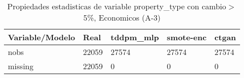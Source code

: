 \begin{table}[H]
\centering
\fontsize{8}{14}\selectfont
\caption{Propiedades estadisticas de variable property\_type con cambio\ensuremath{>}5\%, Economicos (A-3)}
\label{table-stats-economicos-a-3-property_type-short}
\begin{tabular}{|l|m{10em}|m{10em}|m{10em}|m{10em}|}
\hline
 \rowcolor[gray]{0.8}
Variable/Modelo & Real & tddpm\_mlp & smote-enc & ctgan \\
\hline nobs & 22059 & 27574 & 27574 & 27574 \\
\hline missing & 22059 & 0 & 0 & 0 \\
\hline
\end{tabular}
\end{table}
